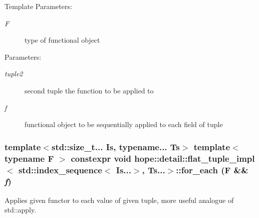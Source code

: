 \begin{Desc}
\item[Template Parameters:]
\begin{description}
\item[{\em F}]type of functional object \end{description}
\end{Desc}
\begin{Desc}
\item[Parameters:]
\begin{description}
\item[{\em tuple2}]second tuple the function to be applied to \item[{\em f}]functional object to be sequentially applied to each field of tuple \end{description}
\end{Desc}
\hypertarget{classhope_1_1detail_1_1flat__tuple__impl_3_01std_1_1index__sequence_3_01_is_8_8_8_4_00_01_ts_8_8_8_4_1ef2389962afceff73d54483975f5628}{
\subsubsection[{for\_\-each}]{\setlength{\rightskip}{0pt plus 5cm}template$<$std::size\_\-t... Is, typename... Ts$>$ template$<$typename F $>$ constexpr void hope::detail::flat\_\-tuple\_\-impl$<$ std::index\_\-sequence$<$ Is...$>$, Ts...$>$::for\_\-each (F \&\& {\em f})}}
\label{classhope_1_1detail_1_1flat__tuple__impl_3_01std_1_1index__sequence_3_01_is_8_8_8_4_00_01_ts_8_8_8_4_1ef2389962afceff73d54483975f5628}


Applies given functor to each value of given tuple, more useful analogue of std::apply. 


